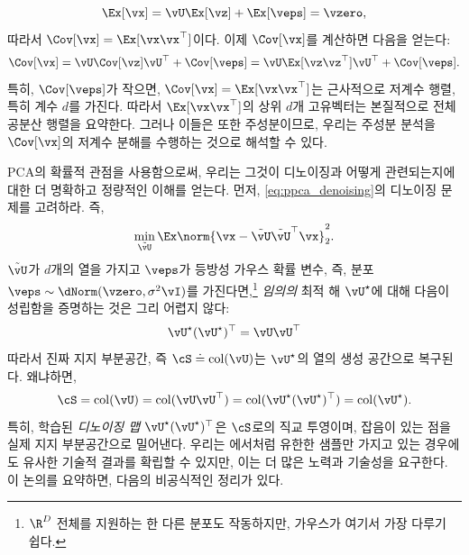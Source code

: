 \documentclass[../../book-main_ko.tex]{subfiles}
\begin{document}
\begin{equation}
    \Ex[\vx] = \vU\Ex[\vz] + \Ex[\veps] = \vzero,
\end{equation}
따라서 \(\Cov[\vx] = \Ex[\vx\vx^{\top}]\)이다. 이제 \(\Cov[\vx]\)를 계산하면 다음을 얻는다:
\begin{equation}
    \Cov[\vx] = \vU\Cov[\vz]\vU^{\top} + \Cov[\veps] = \vU\Ex[\vz\vz^{\top}]\vU^{\top} + \Cov[\veps].
\end{equation}
특히, \(\Cov[\veps]\)가 작으면, \(\Cov[\vx] = \Ex[\vx\vx^{\top}]\)는 근사적으로 저계수 행렬, 특히 계수 \(d\)를 가진다. 따라서 \(\Ex[\vx\vx^{\top}]\)의 상위 \(d\)개 고유벡터는 본질적으로 전체 공분산 행렬을 요약한다. 그러나 이들은 또한 주성분이므로, 우리는 주성분 분석을 \(\Cov[\vx]\)의 저계수 분해를 수행하는 것으로 해석할 수 있다.

\begin{remark}
    PCA의 확률적 관점을 사용함으로써, 우리는 그것이 디노이징과 어떻게 관련되는지에 대한 더 명확하고 정량적인 이해를 얻는다. 먼저, \eqref{eq:ppca_denoising}의 디노이징 문제를 고려하라. 즉,
    \begin{equation}
        \min_{\tilde{\vU}}\Ex\norm{\vx - \tilde{\vU}\tilde{\vU}^{\top}\vx}_{2}^{2}.
    \end{equation}
    \(\tilde{\vU}\)가 \(d\)개의 열을 가지고 \(\veps\)가 등방성 가우스 확률 변수, 즉, 분포 \(\veps \sim \dNorm(\vzero, \sigma^{2}\vI)\)를 가진다면,\footnote{\(\R^{D}\) 전체를 지원하는 한 다른 분포도 작동하지만, 가우스가 여기서 가장 다루기 쉽다.} \textit{임의의} 최적 해 \(\vU^{\star}\)에 대해 다음이 성립함을 증명하는 것은 그리 어렵지 않다:
    \begin{equation}
        \vU^{\star}(\vU^{\star})^{\top} = \vU\vU^{\top}
    \end{equation}
    따라서 진짜 지지 부분공간, 즉 \(\cS \doteq \mathop{\mathrm{col}}(\vU)\)는 \(\vU^{\star}\)의 열의 생성 공간으로 복구된다. 왜냐하면,
    \begin{equation}
        \cS = \mathop{\mathrm{col}}(\vU) = \mathop{\mathrm{col}}(\vU\vU^{\top})
        = \mathop{\mathrm{col}}(\vU^{\star}(\vU^{\star})^{\top})
        = \mathop{\mathrm{col}}(\vU^{\star}).
    \end{equation}
    특히, 학습된 \textit{디노이징 맵} \(\vU^{\star}(\vU^{\star})^{\top}\)은 \(\cS\)로의 직교 투영이며, 잡음이 있는 점을 실제 지지 부분공간으로 밀어낸다. 우리는 에서처럼 유한한 샘플만 가지고 있는 경우에도 유사한 기술적 결과를 확립할 수 있지만, 이는 더 많은 노력과 기술성을 요구한다. 이 논의를 요약하면, 다음의 비공식적인 정리가 있다.
\end{remark}
\end{document}
